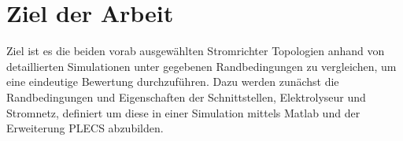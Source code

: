 \section{Ziel der Arbeit}
Ziel ist es die beiden vorab ausgewählten Stromrichter Topologien anhand von detaillierten Simulationen unter gegebenen Randbedingungen zu vergleichen, um eine eindeutige Bewertung durchzuführen. Dazu werden zunächst die Randbedingungen und Eigenschaften der Schnittstellen, Elektrolyseur und Stromnetz, definiert um diese in einer Simulation mittels Matlab und der Erweiterung PLECS abzubilden. 